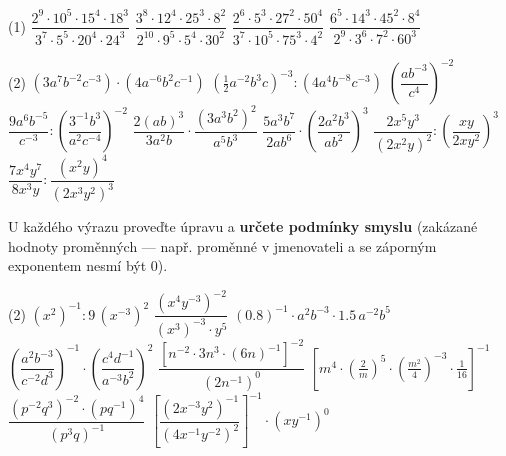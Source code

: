 \documentclass[12pt,a4paper]{article}
\begin{document}
\setcounter{section}{2}
\begin{exercise}
    \begin{tasks}(1)
        \task $\dfrac{2^{9}\cdot 10^{5}\cdot 15^{4}\cdot 18^{3}}{3^{7}\cdot 5^{5}\cdot 20^{4}\cdot 24^{3}}$
        \task $\dfrac{3^{8}\cdot 12^{4}\cdot 25^{3}\cdot 8^{2}}{2^{10}\cdot 9^{5}\cdot 5^{4}\cdot 30^{2}}$
        \task $\dfrac{2^{6}\cdot 5^{3}\cdot 27^{2}\cdot 50^{4}}{3^{7}\cdot 10^{5}\cdot 75^{3}\cdot 4^{2}}$
        \task $\dfrac{6^{5}\cdot 14^{3}\cdot 45^{2}\cdot 8^{4}}{2^{9}\cdot 3^{6}\cdot 7^{2}\cdot 60^{3}}$
    \end{tasks}
\end{exercise}


\setcounter{section}{3}
\begin{exercise}
    \begin{tasks}(2)
        \task $(3a^7b^{-2}c^{-3})\cdot(4a^{-6}b^2c^{-1})$
        \task $\left(\frac{1}{2}a^{-2}b^3c\right)^{-3} : (4a^4b^{-8}c^{-3})$
        \task $\left(\dfrac{ab^{-3}}{c^4}\right)^{-2}$ 
        \task $\dfrac{9a^6b^{-5}}{c^{-3}} : \left(\dfrac{3^{-1}b^3}{a^2c^{-4}}\right)^{-2} $   
        \task $\dfrac{2(ab)^{3}}{3a^{2}b}\cdot\dfrac{(3a^{3}b^{2})^{2}}{a^{5}b^{3}}$
        \task $\dfrac{5a^{3}b^{7}}{2ab^{6}}\cdot\left(\dfrac{2a^{2}b^{3}}{ab^{2}}\right)^{3}$
        \task $\dfrac{2x^{5}y^{3}}{(2x^{2}y)^{2}} : \left(\dfrac{xy}{2xy^{2}}\right)^{3}$
        \task $\dfrac{7x^{4}y^{7}}{8x^{3}y} : \dfrac{(x^{2}y)^{4}}{(2x^{3}y^{2})^{3}}$    
    \end{tasks}
\end{exercise}


\begin{exercise}
    U každého výrazu proveďte úpravu a \textbf{určete podmínky smyslu} (zakázané hodnoty proměnných — např. proměnné v
    jmenovateli a se záporným exponentem nesmí být $0$).
    \begin{tasks}(2)
        \task $(x^{2})^{-1} : 9\,(x^{-3})^{2}$
        \task $\dfrac{(x^{4}y^{-3})^{-2}}{(x^{3})^{-3}\cdot y^{5}}$
        \task $(0.8)^{-1}\cdot a^{2}b^{-3}\cdot 1.5\,a^{-2}b^{5}$
        \task $\left(\dfrac{a^{2}b^{-3}}{c^{-2}d^{3}}\right)^{-1}\cdot \left(\dfrac{c^{4}d^{-1}}{a^{-3}b^{2}}\right)^{2}$
        \task $\dfrac{\left[n^{-2}\cdot 3n^{3}\cdot (6n)^{-1}\right]^{-2}}{(2n^{-1})^{0}}$
        \task $\left[m^{4}\cdot \left(\tfrac{2}{m}\right)^{5}\cdot \left(\tfrac{m^{2}}{4}\right)^{-3}\cdot \tfrac{1}{16}\right]^{-1}$
        \task $\dfrac{(p^{-2}q^{3})^{-2}\cdot (pq^{-1})^{4}}{(p^{3}q)^{-1}}$
        \task $\left[\dfrac{(2x^{-3}y^{2})^{-1}}{(4x^{-1}y^{-2})^{2}}\right]^{-1} \cdot (xy^{-1})^{0}$
    \end{tasks}
\end{exercise}
\end{document}
